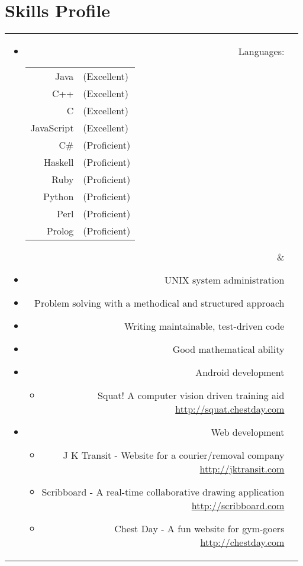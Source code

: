 \section*{Skills Profile}

\begin{tabular}{rl}

\parbox[t]{0.3\textwidth}{
	\begin{itemize}
		\item Languages:
		\begin{tabular}[h]{rl}
			Java & (Excellent)\\
			C++ & (Excellent)\\
			C & (Excellent)\\
			JavaScript & (Excellent)\\
			C\# & (Proficient)\\
			Haskell & (Proficient)\\
			Ruby & (Proficient)\\
			Python & (Proficient)\\
			Perl & (Proficient)\\
			Prolog & (Proficient)
		\end{tabular}
	\end{itemize}}
&
\parbox[t]{0.6\textwidth}{
	\begin{itemize}
		\item UNIX system administration
		\item Problem solving with a methodical and structured approach
		\item Writing maintainable, test-driven code
		\item Good mathematical ability
		\item Android development
			\begin{itemize}
				\item Squat! A computer vision driven training aid\\
				\url{http://squat.chestday.com}
			\end{itemize}
		\item Web development
			\begin{itemize}
				\item J K Transit - Website for a courier/removal company\\
				\url{http://jktransit.com}
				\item Scribboard - A real-time collaborative drawing application\\
				\url{http://scribboard.com}
				\item Chest Day - A fun website for gym-goers\\
				\url{http://chestday.com}
			\end{itemize}
	\end{itemize}}\\

\end{tabular}